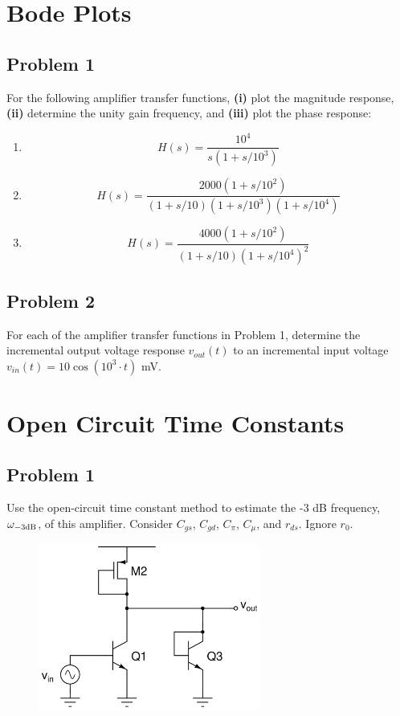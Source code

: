 \documentclass{article}
\begin{document}
\section*{Bode Plots}
\subsection*{Problem 1}
For the following amplifier transfer functions, \textbf{(i)} plot the magnitude response, \textbf{(ii)} determine the unity gain frequency, and \textbf{(iii)} plot the phase response:
\begin{enumerate}[label=\textbf{(\alph*)}]
    \item $$H(s) = \frac{10^4}{s(1+s/10^3)}$$
    \item $$H(s) = \frac{2000\left(1 + s/10^2\right)}{\left(1 + s/10\right)\left(1 + s/10^3\right)\left(1 + s/10^4\right)}$$
    \item $$H(s) = \frac{4000(1+s/10^2)}{(1+s/10)(1+s/10^4)^2}$$
\end{enumerate}
\newpage
\subsection*{Problem 2}
For each of the amplifier transfer functions in Problem 1, determine the incremental output voltage response $v_{out}(t)$ to an incremental input voltage $v_{in}(t) = 10\cos(10^3 \cdot t)$ mV.
\newpage
\section*{Open Circuit Time Constants}
\subsection*{Problem 1}
Use the open-circuit time constant method to estimate the -3 dB frequency, $\omega_{\rm -3 dB}$, of this amplifier.  Consider $C_{gs}$, $C_{gd}$, $C_{\pi}$, $C_{\mu}$, and $r_{ds}$.  Ignore $r_0$. \\ 
\begin{figure}[!h]
\begin{center}
    \includegraphics[width=0.65\textwidth]{figures/cc_octc2.png}
\end{center}
\end{figure}
\newpage
\end{document}
